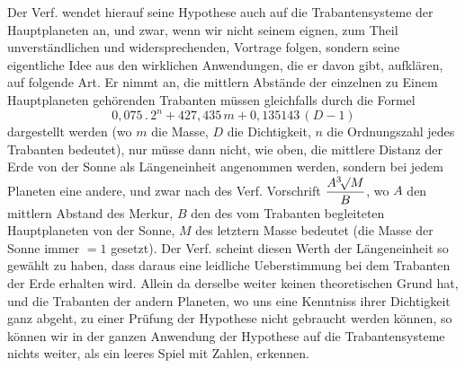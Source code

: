 Der Verf. wendet hierauf seine Hypothese auch auf die Trabantensysteme der Hauptplaneten an, und zwar, wenn wir nicht seinem eignen, zum Theil unverständlichen und widersprechenden, Vortrage folgen, sondern seine eigentliche Idee aus den wirklichen Anwendungen, die er davon gibt, aufklären, auf folgende Art. Er nimmt an, die mittlern Abstände der einzelnen zu Einem Hauptplaneten gehörenden Trabanten müssen gleichfalls durch die Formel
\[ \mathrm{0{,}075} \,.\, 2^n + \mathrm{427{,}435}\, m + \mathrm{0{,}135143}\,(D - \mathrm{1}) \]
dargestellt werden (wo $m$ die Masse, $D$ die Dichtigkeit, $n$ die Ordnungszahl jedes Trabanten bedeutet), nur müsse dann nicht, wie oben, die mittlere Distanz der Erde von der Sonne als Längeneinheit angenommen werden, sondern bei jedem Planeten eine andere, und zwar nach des Verf. Vorschrift $\dfrac{A\BareRoot[3]{M}}{B}$, wo $A$ den mittlern Abstand des Merkur, $B$ den des vom Trabanten begleiteten Hauptplaneten von der Sonne, $M$ des letztern Masse bedeutet (die Masse der Sonne immer $= \mathrm{1}$ gesetzt). Der Verf. scheint diesen Werth der Längeneinheit so gewählt zu haben, dass daraus eine leidliche Ueberstimmung bei dem Trabanten der Erde erhalten wird. Allein da derselbe weiter keinen theoretischen Grund hat, und die Trabanten der andern Planeten, wo uns eine Kenntniss ihrer Dichtigkeit ganz abgeht, zu einer Prüfung der Hypothese nicht gebraucht werden können, so können wir in der ganzen Anwendung der Hypothese auf die Trabantensysteme nichts weiter, als ein leeres Spiel mit Zahlen, erkennen.

